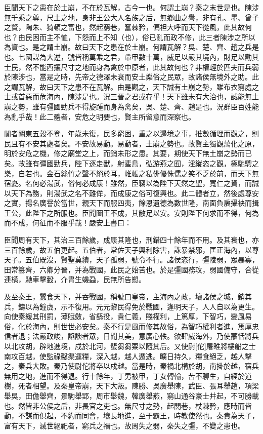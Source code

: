 \begin{pinyinscope}
臣聞天下之患在於土崩，不在於瓦解，古今一也。何謂土崩？秦之末世是也。陳涉無千乘之尊，尺土之地，身非王公大人名族之后，無鄉曲之譽，非有孔、墨、曾子之賢，陶朱、猗頓之富也，然起窮巷，奮棘矜，偏袒大呼而天下從風，此其故何也？由民困而主不恤，下怨而上不知（也），俗已亂而政不修，此三者陳涉之所以為資也。是之謂土崩。故曰天下之患在於土崩。何謂瓦解？吳、楚、齊、趙之兵是也。七國謀為大逆，號皆稱萬乘之君，帶甲數十萬，威足以嚴其境內，財足以勸其士民，然不能西攘尺寸之地而身為禽於中原者，此其故何也？非權輕於匹夫而兵弱於陳涉也，當是之時，先帝之德澤未衰而安土樂俗之民眾，故諸侯無境外之助。此之謂瓦解，故曰天下之患不在瓦解。由是觀之，天下誠有土崩之勢，雖布衣窮處之士或首惡而危海內，陳涉是也。況三晉之君或存乎！天下雖未有大治也，誠能無土崩之勢，雖有彊國勁兵不得旋踵而身為禽矣，吳、楚、齊、趙是也。況群臣百姓能為亂乎哉！此二體者，安危之明要也，賢主所留意而深察也。

閒者關東五穀不登，年歲未復，民多窮困，重之以邊境之事，推數循理而觀之，則民且有不安其處者矣。不安故易動。易動者，土崩之勢也。故賢主獨觀萬化之原，明於安危之機，修之廟堂之上，而銷未形之患。其要，期使天下無土崩之勢而已矣。故雖有彊國勁兵，陛下逐走獸，射蜚鳥，弘游燕之囿，淫縱恣之觀，極馳騁之樂，自若也。金石絲竹之聲不絕於耳，帷帳之私俳優侏儒之笑不乏於前，而天下無宿憂。名何必湯武，俗何必成康！雖然，臣竊以為陛下天然之聖，寬仁之資，而誠以天下為務，則湯武之名不難侔，而成康之俗可復興也。此二體者立，然後處尊安之實，揚名廣譽於當世，親天下而服四夷，餘恩遺德為數世隆，南面負扆攝袂而揖王公，此陛下之所服也。臣聞圖王不成，其敝足以安。安則陛下何求而不得，何為而不成，何征而不服乎哉！嚴安上書曰：

臣聞周有天下，其治三百餘歲，成康其隆也，刑錯四十餘年而不用。及其衰也，亦三百餘歲，故五伯更起。五伯者，常佐天子興利除害，誅暴禁邪，匡正海內，以尊天子。五伯既沒，賢聖莫續，天子孤弱，號令不行。諸侯恣行，彊陵弱，眾暴寡，田常篡齊，六卿分晉，并為戰國，此民之始苦也。於是彊國務攻，弱國備守，合從連橫，馳車擊轂，介胄生蟣蝨，民無所告愬。

及至秦王，蠶食天下，并吞戰國，稱號曰皇帝，主海內之政，壞諸侯之城，銷其兵，鑄以為鐘虡，示不復用。元元黎民得免於戰國，逢明天子，人人自以為更生。向使秦緩其刑罰，薄賦斂，省繇役，貴仁義，賤權利，上篤厚，下智巧，變風易俗，化於海內，則世世必安矣。秦不行是風而修其故俗，為智巧權利者進，篤厚忠信者退；法嚴政峻，諂諛者眾，日聞其美，意廣心軼。欲肆威海外，乃使蒙恬將兵以北攻胡，辟地進境，戍於北河，蜚芻芻粟以隨其后。又使尉[佗]屠睢將樓船之士南攻百越，使監祿鑿渠運糧，深入越，越人遁逃。曠日持久，糧食絕乏，越人擊之，秦兵大敗。秦乃使尉佗將卒以戍越。當是時，秦禍北構於胡，南掛於越，宿兵無用之地，進而不得退。行十餘年，丁男被甲，丁女轉輸，苦不聊生，自經於道樹，死者相望。及秦皇帝崩，天下大叛。陳勝、吳廣舉陳，武臣、張耳舉趙，項梁舉吳，田儋舉齊，景駒舉郢，周市舉魏，韓廣舉燕，窮山通谷豪士并起，不可勝載也。然皆非公侯之后，非長官之吏也。無尺寸之勢，起閭巷，杖棘矜，應時而皆動，不謀而俱起，不約而同會，壤長地進，至于霸王，時教使然也。秦貴為天子，富有天下，滅世絕祀者，窮兵之禍也。故周失之弱，秦失之彊，不變之患也。


\end{pinyinscope}
